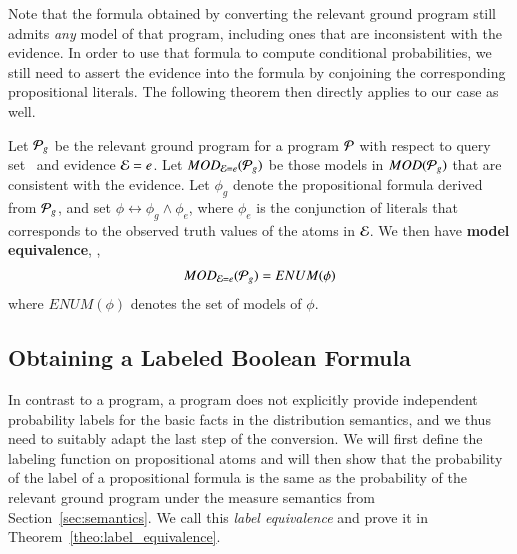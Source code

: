 
















Note that the formula obtained by converting the relevant ground program still admits \emph{any} model of that program, including ones that are inconsistent with the evidence. In order to use that formula to compute conditional probabilities, we still need to assert  the evidence into the formula by conjoining the corresponding propositional literals. 
The following theorem then directly applies to our case as well.
\begin{theorem}
\label{theo:model_equivalence}
Let $\mathcal{P}_g$ be the relevant ground program for a \dcproblogsty program $\mathcal{P}$ with respect to  query set \queryset\ and  evidence $\mathcal{E}=e$. Let $MOD_{\mathcal{E}=e}(\mathcal{P}_g)$ be those models in $MOD(\mathcal{P}_g)$ that are consistent with the evidence.
Let $\phi_g$ denote the  propositional formula derived from $\mathcal{P}_g$, and set $\phi \leftrightarrow \phi_g \land \phi_e$, where  $\phi_e$ is the conjunction of literals that corresponds to the observed truth values of the atoms in $\mathcal{E}$. We then have {\bf model equivalence}, \ie, 
\begin{align}
    MOD_{\mathcal{E}=e}(\mathcal{P}_g)
    =
    ENUM(\phi)
\end{align}
where $ENUM(\phi)$ denotes the set of models of $\phi$.
\end{theorem}


\subsection{Obtaining a Labeled Boolean Formula}

In contrast to a \problogsty program, a \dcproblogsty program does not explicitly provide independent probability labels for the basic facts in the distribution semantics, and we thus need to suitably adapt the last step of the conversion. 
We will first define the labeling function on propositional atoms and will then show that the probability of the label of a propositional formula is the same as the probability of the relevant ground program under the measure semantics from Section~\ref{sec:semantics}. We call this {\em label equivalence} and prove it in Theorem~\ref{theo:label_equivalence}. 


